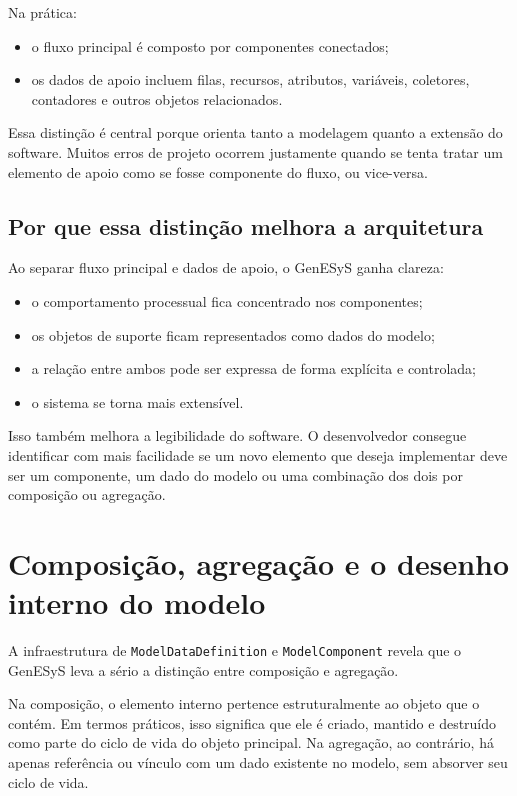 Na prática:
\begin{itemize}
    \item o fluxo principal é composto por componentes conectados;
    \item os dados de apoio incluem filas, recursos, atributos, variáveis, coletores, contadores e outros objetos relacionados.
\end{itemize}

Essa distinção é central porque orienta tanto a modelagem quanto a extensão do software. Muitos erros de projeto ocorrem justamente quando se tenta tratar um elemento de apoio como se fosse componente do fluxo, ou vice-versa.

\subsection{Por que essa distinção melhora a arquitetura}
\label{subsec:cap8_por_que_distincao_melhora_arquitetura}

Ao separar fluxo principal e dados de apoio, o GenESyS ganha clareza:
\begin{itemize}
    \item o comportamento processual fica concentrado nos componentes;
    \item os objetos de suporte ficam representados como dados do modelo;
    \item a relação entre ambos pode ser expressa de forma explícita e controlada;
    \item o sistema se torna mais extensível.
\end{itemize}

Isso também melhora a legibilidade do software. O desenvolvedor consegue identificar com mais facilidade se um novo elemento que deseja implementar deve ser um componente, um dado do modelo ou uma combinação dos dois por composição ou agregação.

\section{Composição, agregação e o desenho interno do modelo}
\label{sec:cap8_composicao_agregacao}

A infraestrutura de \texttt{ModelDataDefinition} e \texttt{ModelComponent} revela que o GenESyS leva a sério a distinção entre composição e agregação.

Na composição, o elemento interno pertence estruturalmente ao objeto que o contém. Em termos práticos, isso significa que ele é criado, mantido e destruído como parte do ciclo de vida do objeto principal. Na agregação, ao contrário, há apenas referência ou vínculo com um dado existente no modelo, sem absorver seu ciclo de vida.

